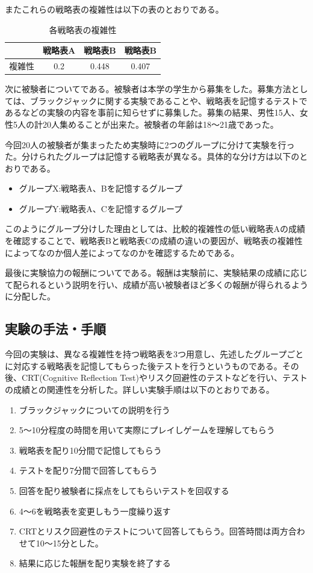 またこれらの戦略表の複雑性は以下の表のとおりである。
\begin{table}[H]
    \begin{center}
    \caption{各戦略表の複雑性}
    \begin{tabular}{|c|c|c|c|}
        \hline
            & 戦略表A & 戦略表B  & 戦略表B  \\ \hline
        複雑性 & 0.2  & 0.448 & 0.407 \\ \hline
    \end{tabular}   
    \end{center}
\end{table}

次に被験者についてである。被験者は本学の学生から募集をした。募集方法としては、ブラックジャックに関する実験であることや、戦略表を記憶するテストであるなどの実験の内容を事前に知らせずに募集した。募集の結果、男性15人、女性5人の計20人集めることが出来た。被験者の年齢は18〜21歳であった。

今回20人の被験者が集まったため実験時に2つのグループに分けて実験を行った。分けられたグループは記憶する戦略表が異なる。具体的な分け方は以下のとおりである。
\begin{itemize}
    \item グループX:戦略表A、Bを記憶するグループ
    \item グループY:戦略表A、Cを記憶するグループ
\end{itemize}
このようにグループ分けした理由としては、比較的複雑性の低い戦略表Aの成績を確認することで、戦略表Bと戦略表Cの成績の違いの要因が、戦略表の複雑性によってなのか個人差によってなのかを確認するためである。

最後に実験協力の報酬についてである。報酬は実験前に、実験結果の成績に応じて配られるという説明を行い、成績が高い被験者ほど多くの報酬が得られるように分配した。

\subsection{実験の手法・手順}

今回の実験は、異なる複雑性を持つ戦略表を3つ用意し、先述したグループごとに対応する戦略表を記憶してもらった後テストを行うというものである。その後、CRT(Cognitive Reflection Test)やリスク回避性のテストなどを行い、テストの成績との関連性を分析した。詳しい実験手順は以下のとおりである。
\begin{enumerate}
    \item ブラックジャックについての説明を行う
    \item 5〜10分程度の時間を用いて実際にプレイしゲームを理解してもらう
    \item 戦略表を配り10分間で記憶してもらう
    \item テストを配り7分間で回答してもらう
    \item 回答を配り被験者に採点をしてもらいテストを回収する
    \item 4〜6を戦略表を変更しもう一度繰り返す
    \item CRTとリスク回避性のテストについて回答してもらう。回答時間は両方合わせて10〜15分とした。
    \item 結果に応じた報酬を配り実験を終了する
\end{enumerate}

